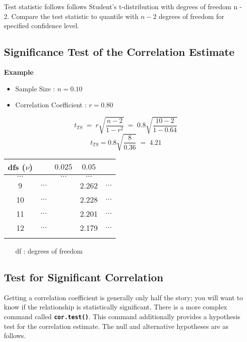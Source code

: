 Test statistic follows follows Student's t-distribution with degrees of freedom n - 2. Compare the test statistic to quantile with $n-2$ degrees of freedom for specified confidence level.



\subsection{Significance Test of the Correlation Estimate}
\Large
\vspace{-1.0cm}
\textbf{Example}

\begin{itemize}
\item Sample Size : $n = 0.10$
\item Correlation Coefficient : $r = 0.80$
\end{itemize}
\vspace{0.2cm}

\[ t_{TS} \; = \; r\sqrt{\frac{n-2}{1 - r^2}} \; = \; 0.8 \sqrt{\frac{10-2}{1 - 0.64}}  \]
\vspace{0.2cm}
\[ t_{TS} = 0.8 \sqrt{\frac{8}{0.36}} \; = \; 4.21 \]

  


\Large
\begin{center}
\begin{tabular}{|c||c|c|c|c|}
\hline dfs ($\nu$) &  & $0.025$ & $0.05$ &  \\ \hline
\hline $\ldots$ &  & $\ldots$ & $\ldots$ &  \\ 
\hline 9 & $\ldots$ &  & 2.262  &  $\ldots$ \\ 
\hline 10 & $\ldots$ & & 2.228   & $\ldots$ \\ 
\hline 11 & $\ldots$ & & 2.201    & $\ldots$ \\ 
\hline 12 & $\ldots$ & & 2.179   & $\ldots$ \\ 
\hline \phantom{spaces} & \phantom{spaces} & \phantom{spaces}  & \phantom{spaces} & \phantom{spaces} \\ 
\hline 
\end{tabular} 
\end{center}
\begin{itemize}
\item[df] : degrees of freedom
\end{itemize}
\newpage
\subsection*{Test for Significant Correlation}
Getting a correlation coefficient is generally only half the story; you will want to know if the relationship is statistically significant. There is a more complex command called \texttt{\textbf{cor.test()}}. This command additionally provides a hypothesis test for the correlation estimate. The null and alternative hypotheses are as follows.

